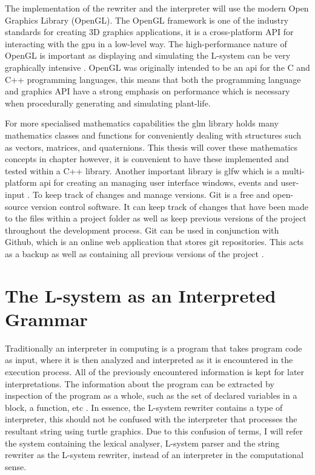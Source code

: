 The implementation of the rewriter and the interpreter will use the modern Open Graphics Library (\gls{OpenGL}). The OpenGL framework is one of the industry standards for creating 3D graphics applications, it is a cross-platform API for interacting with the \acrshort{gpu} in a low-level way. The high-performance nature of OpenGL is important as displaying and simulating the L-system can be very graphically intensive \cite{sellers2013opengl} \cite{movania2017opengl}. OpenGL was originally intended to be an \acrshort{api} for the C and C++ programming languages, this means that both the programming language and graphics API have a strong emphasis on performance which is necessary when procedurally generating and simulating plant-life.

For more specialised mathematics capabilities the \acrfull{glm} library holds many mathematics classes and functions for conveniently dealing with structures such as vectors, matrices, and quaternions. This thesis will cover these mathematics concepts in chapter \label{maths chapter} however, it is convenient to have these implemented and tested within a C++ library. Another important library is \acrfull{glfw} which is a multi-platform \acrshort{api} for creating an managing user interface windows, events and user-input \cite{glfwDocumentation}. To keep track of changes and manage versions. Git is a free and open-source version control software. It can keep track of changes that have been made to the files within a project folder as well as keep previous versions of the project throughout the development process. Git can be used in conjunction with Github, which is an online web application that stores git repositories. This acts as a backup as well as containing all previous versions of the project \cite{torvalds}.

\section{The L-system as an Interpreted Grammar}

Traditionally an interpreter in computing is a program that takes program code as input, where it is then analyzed and interpreted as it is encountered in the execution process. All of the previously encountered information is kept for later interpretations. The information about the program can be extracted by inspection of the program as a whole, such as the set of declared variables in a block, a function, etc \cite{wilhelm2010compiler}. In essence, the L-system rewriter contains a type of interpreter, this should not be confused with the interpreter that processes the resultant string using turtle graphics. Due to this confusion of terms, I will refer the system containing the lexical analyser, L-system parser and the string rewriter as the L-system rewriter, instead of an interpreter in the computational sense. 

